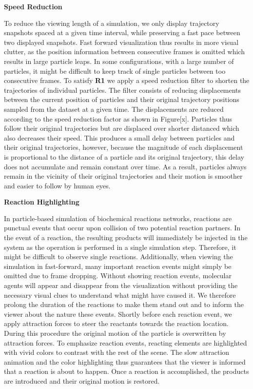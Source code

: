 \textbf{Speed Reduction}

To reduce the viewing length of a simulation, we only display trajectory snapshots spaced at a given time interval, while preserving a fast pace between two displayed snapshots.
Fast forward visualization thus results in more visual clutter, as the position information between consecutive frames is omitted which results in large particle leaps.
In some configurations, with a large number of particles, it might be difficult to keep track of single particles between too consecutive frames.
To satisfy \textbf{R1} we apply a speed reduction filter to shorten the trajectories of individual particles.
The filter consists of reducing displacements between the current position of particles and their original trajectory positions sampled from the dataset at a given time.
The displacements are reduced according to the speed reduction factor as shown in Figure[x].
Particles thus follow their original trajectories but are displaced over shorter distanced which also decreases their speed.
This produces a small delay between particles and their original trajectories, however, because the magnitude of each displacement is proportional to the distance of a particle and its original trajectory, this delay does not accumulate and remain constant over time.
As a result, particles always remain in the vicinity of their original trajectories and their motion is smoother and easier to follow by human eyes.

\textbf{Reaction Highlighting}

In particle-based simulation of biochemical reactions networks, reactions are punctual events that occur upon collision of two potential reaction partners.
In the event of a reaction, the resulting products will immediately be injected in the system as the operation is performed in a single simulation step.
Therefore, it might be difficult to observe single reactions.
Additionally, when viewing the simulation in fast-forward, many important reaction events might simply be omitted due to frame dropping.
Without showing reaction events, molecular agents will appear and disappear from the visualization without providing the necessary visual clues to understand what might have caused it.
We therefore prolong the duration of the reactions to make them stand out and to inform the viewer about the nature these events.
Shortly before each reaction event, we apply attraction forces to steer the reactants towards the reaction location. 
During this procedure the original motion of the particle is overwritten by attraction forces.
To emphasize reaction events, reacting elements are highlighted with vivid colors to contrast with the rest of the scene.
The slow attraction animation and the color highlighting thus guarantees that the viewer is informed that a reaction is about to happen.
Once a reaction is accomplished, the products are introduced and their original motion is restored.

